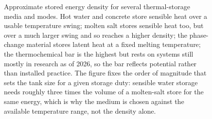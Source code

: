 \begin{figure}[htbp]
\centering
{}
\caption[Thermal-storage energy density by medium and mode]{Approximate stored
energy density for several thermal-storage media and modes. Hot water and
concrete store sensible heat over a usable temperature swing; molten salt stores
sensible heat too, but over a much larger swing and so reaches a higher density;
the phase-change material stores latent heat at a fixed melting temperature; the
thermochemical bar is the highest but rests on systems still mostly in research as
of 2026, so the bar reflects potential rather than installed practice. The figure
fixes the order of magnitude that sets the tank size for a given storage duty:
sensible water storage needs roughly three times the volume of a molten-salt
store for the same energy, which is why the medium is chosen against the
available temperature range, not the density alone.}
\label{fig:vol04ch06:storage-comparison}
\end{figure}
